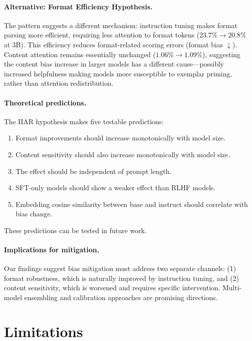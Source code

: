 \documentclass[11pt,twocolumn]{article}
\begin{document}
\paragraph{Alternative: Format Efficiency Hypothesis.}
The pattern suggests a different mechanism: instruction tuning makes format parsing more efficient, requiring less attention to format tokens ($23.7\% \to 20.8\%$ at 3B). This efficiency reduces format-related scoring errors (format bias $\downarrow$). Content attention remains essentially unchanged ($1.06\% \to 1.09\%$), suggesting the content bias increase in larger models has a different cause---possibly increased helpfulness making models more susceptible to exemplar priming, rather than attention redistribution.

\paragraph{Theoretical predictions.}
The IIAR hypothesis makes five testable predictions:
\begin{enumerate}
    \item Format improvements should increase monotonically with model size.
    \item Content sensitivity should also increase monotonically with model size.
    \item The effect should be independent of prompt length.
    \item SFT-only models should show a weaker effect than RLHF models.
    \item Embedding cosine similarity between base and instruct should correlate with bias change.
\end{enumerate}
These predictions can be tested in future work.

\paragraph{Implications for mitigation.}
Our findings suggest bias mitigation must address two separate channels: (1) format robustness, which is naturally improved by instruction tuning, and (2) content sensitivity, which is worsened and requires specific intervention. Multi-model ensembling and calibration approaches are promising directions.

\section{Limitations}
\end{document}
